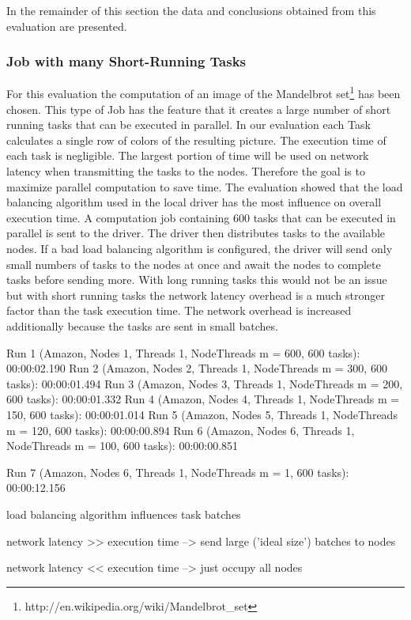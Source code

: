 \documentclass[12pt]{article}
\begin{document}
In the remainder of this section the data and conclusions obtained from this evaluation are presented.

\subsubsection{Job with many Short-Running Tasks}

For this evaluation the computation of an image of the Mandelbrot set\footnote{http://en.wikipedia.org/wiki/Mandelbrot\_set} has been chosen.
This type of Job has the feature that it creates a large number of short running tasks that can be executed in parallel. In our evaluation each Task calculates a single row of colors of the resulting picture. The execution time of each task is negligible. The largest portion of time will be used on network latency when transmitting the tasks to the nodes. Therefore the goal is to maximize parallel computation to save time. The evaluation showed that the load balancing algorithm used in the local driver has the most influence on overall execution time. A computation job containing 600 tasks that can be executed in parallel is sent to the driver. The driver then distributes tasks to the available nodes. If a bad load balancing algorithm is configured, the driver will send only small numbers of tasks to the nodes at once and await the nodes to complete tasks before sending more. With long running tasks this would not be an issue but with short running tasks the network latency overhead is a much stronger factor than the task execution time. The network overhead is increased additionally because the tasks are sent in small batches.

Run 1 (Amazon, Nodes 1, Threads 1, NodeThreads m = 600, 600 tasks): 00:00:02.190
Run 2 (Amazon, Nodes 2, Threads 1, NodeThreads m = 300, 600 tasks): 00:00:01.494
Run 3 (Amazon, Nodes 3, Threads 1, NodeThreads m = 200, 600 tasks): 00:00:01.332
Run 4 (Amazon, Nodes 4, Threads 1, NodeThreads m = 150, 600 tasks): 00:00:01.014
Run 5 (Amazon, Nodes 5, Threads 1, NodeThreads m = 120, 600 tasks): 00:00:00.894
Run 6 (Amazon, Nodes 6, Threads 1, NodeThreads m = 100, 600 tasks): 00:00:00.851

Run 7 (Amazon, Nodes 6, Threads 1, NodeThreads m = 1, 600 tasks): 00:00:12.156

load balancing algorithm influences task batches

network latency >> execution time --> send large ('ideal size') batches to nodes

network latency << execution time --> just occupy all nodes
\end{document}
